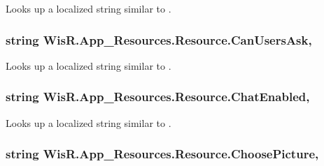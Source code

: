 Looks up a localized string similar to . 

\hypertarget{class_wis_r_1_1_app___resources_1_1_resource_aa809e96b26c2a8f0db0985a51d1fcb7a}{}
\subsubsection[{Can\+Users\+Ask}]{\setlength{\rightskip}{0pt plus 5cm}string Wis\+R.\+App\+\_\+\+Resources.\+Resource.\+Can\+Users\+Ask\hspace{0.3cm}{\ttfamily [static]}, {\ttfamily [get]}}\label{class_wis_r_1_1_app___resources_1_1_resource_aa809e96b26c2a8f0db0985a51d1fcb7a}


Looks up a localized string similar to . 

\hypertarget{class_wis_r_1_1_app___resources_1_1_resource_a58688d3d08c8eb997cd135085769321a}{}
\subsubsection[{Chat\+Enabled}]{\setlength{\rightskip}{0pt plus 5cm}string Wis\+R.\+App\+\_\+\+Resources.\+Resource.\+Chat\+Enabled\hspace{0.3cm}{\ttfamily [static]}, {\ttfamily [get]}}\label{class_wis_r_1_1_app___resources_1_1_resource_a58688d3d08c8eb997cd135085769321a}


Looks up a localized string similar to . 

\hypertarget{class_wis_r_1_1_app___resources_1_1_resource_a1effe30192b1e03f1da0b3e7ba29b736}{}
\subsubsection[{Choose\+Picture}]{\setlength{\rightskip}{0pt plus 5cm}string Wis\+R.\+App\+\_\+\+Resources.\+Resource.\+Choose\+Picture\hspace{0.3cm}{\ttfamily [static]}, {\ttfamily [get]}}\label{class_wis_r_1_1_app___resources_1_1_resource_a1effe30192b1e03f1da0b3e7ba29b736}


